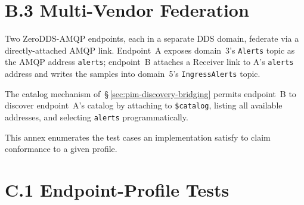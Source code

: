 \documentclass{../styles/zerodds-vendor-spec}
\begin{document}
\section*{B.3 Multi-Vendor Federation}

Two ZeroDDS-AMQP endpoints, each in a separate DDS domain, federate
via a directly-attached AMQP link. Endpoint~A exposes domain~3's
\texttt{Alerts} topic as the AMQP address \texttt{alerts}; endpoint~B
attaches a Receiver link to A's \texttt{alerts} address and writes
the samples into domain~5's \texttt{IngressAlerts} topic.

The catalog mechanism of~\S\,\ref{sec:pim-discovery-bridging} permits
endpoint~B to discover endpoint~A's catalog by attaching to
\texttt{\$catalog}, listing all available addresses, and selecting
\texttt{alerts} programmatically.


This annex enumerates the test cases an implementation
 satisfy to claim conformance to a given profile.

\section*{C.1 Endpoint-Profile Tests}
\end{document}
